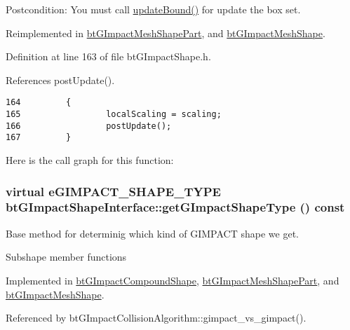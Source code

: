 \begin{Desc}
\item[Postcondition:]You must call \hyperlink{classbt_g_impact_shape_interface_cb26c2d7a2aecabd06b996b72b848492}{updateBound()} for update the box set. \end{Desc}


Reimplemented in \hyperlink{classbt_g_impact_mesh_shape_part_2c1de297d020a75e1ab0f10f7c71478f}{btGImpactMeshShapePart}, and \hyperlink{classbt_g_impact_mesh_shape_ed8d5e4b2e75538109909d44b244bc35}{btGImpactMeshShape}.

Definition at line 163 of file btGImpactShape.h.

References postUpdate().

\begin{Code}\begin{verbatim}164         {
165                 localScaling = scaling;
166                 postUpdate();
167         }
\end{verbatim}
\end{Code}




Here is the call graph for this function:\hypertarget{classbt_g_impact_shape_interface_25cacbe448997e3f8ec99cb2d4952859}{
\subsubsection[getGImpactShapeType]{\setlength{\rightskip}{0pt plus 5cm}virtual eGIMPACT\_\-SHAPE\_\-TYPE btGImpactShapeInterface::getGImpactShapeType () const}}
\label{classbt_g_impact_shape_interface_25cacbe448997e3f8ec99cb2d4952859}


Base method for determinig which kind of GIMPACT shape we get. 

Subshape member functions 

Implemented in \hyperlink{classbt_g_impact_compound_shape_861967c52cb52a358b8d99aa4c65e306}{btGImpactCompoundShape}, \hyperlink{classbt_g_impact_mesh_shape_part_5ff615b55a2bdaeba511fb116a9ab546}{btGImpactMeshShapePart}, and \hyperlink{classbt_g_impact_mesh_shape_cd958461b4f7802e5bceed2db87c4ff0}{btGImpactMeshShape}.

Referenced by btGImpactCollisionAlgorithm::gimpact\_\-vs\_\-gimpact().

